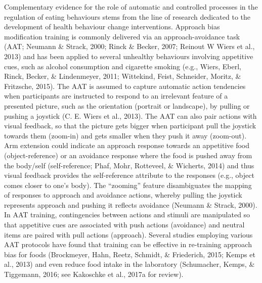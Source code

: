\documentclass[man,floatsintext]{apa6}
\begin{document}
\par

Complementary evidence for the role of automatic and controlled processes in the regulation of eating behaviours stems from the line of research dedicated to the development of health behaviour change interventions. Approach bias modification training is commonly delivered via an approach-avoidance task (AAT; Neumann \& Strack, 2000; Rinck \& Becker, 2007; Reinout W Wiers et al., 2013) and has been applied to several unhealthy behaviours involving appetitive cues, such as alcohol consumption and cigarette smoking (e.g., Wiers, Eberl, Rinck, Becker, \& Lindenmeyer, 2011; Wittekind, Feist, Schneider, Moritz, \& Fritzsche, 2015). The AAT is assumed to capture automatic action tendencies when participants are instructed to respond to an irrelevant feature of a presented picture, such as the orientation (portrait or landscape), by pulling or pushing a joystick (C. E. Wiers et al., 2013). The AAT can also pair actions with visual feedback, so that the picture gets bigger when participant pull the joystick towards them (zoom-in) and gets smaller when they push it away (zoom-out). Arm extension could indicate an approach response towards an appetitive food (object-reference) or an avoidance response where the food is pushed away from the body/self (self-reference; Phaf, Mohr, Rotteveel, \& Wicherts, 2014) and thus visual feedback provides the self-reference attribute to the responses (e.g., object comes closer to one's body). The \enquote{zooming} feature disambiguates the mapping of responses to approach and avoidance actions, whereby pulling the joystick represents approach and pushing it reflects avoidance (Neumann \& Strack, 2000). In AAT training, contingencies between actions and stimuli are manipulated so that appetitive cues are associated with push actions (avoidance) and neutral items are paired with pull actions (approach). Several studies employing various AAT protocols have found that training can be effective in re-training approach bias for foods (Brockmeyer, Hahn, Reetz, Schmidt, \& Friederich, 2015; Kemps et al., 2013) and even reduce food intake in the laboratory (Schumacher, Kemps, \& Tiggemann, 2016; see Kakoschke et al., 2017a for review).

\par
\end{document}

